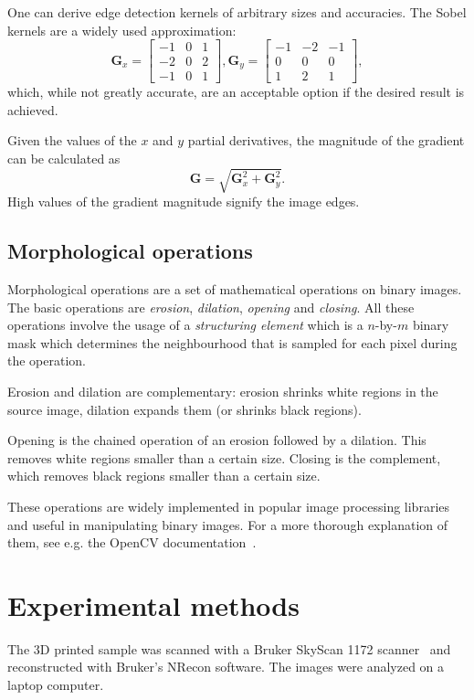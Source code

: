 \documentclass[a4paper,twoside,12pt]{article}
\begin{document}
One can derive edge detection kernels of arbitrary sizes and accuracies. The Sobel kernels are a widely used approximation:
\begin{equation}
    \mathbf{G}_x = \begin{bmatrix}
        -1 & 0 & 1 \\
        -2 & 0 & 2 \\
        -1 & 0 & 1
    \end{bmatrix},
    \mathbf{G}_y = \begin{bmatrix}
        -1 & -2 & -1 \\
        0 & 0 & 0 \\
        1 & 2 & 1
    \end{bmatrix},
\end{equation}
which, while not greatly accurate, are an acceptable option if the desired result is achieved.

Given the values of the $x$ and $y$ partial derivatives, the magnitude of the gradient can be calculated as
\[
    \mathbf{G} = \sqrt{\mathbf{G}_x^2 + \mathbf{G}_y^2}.
\]
High values of the gradient magnitude signify the image edges.

\subsection{Morphological operations}
Morphological operations are a set of mathematical operations on binary images. The basic operations are \emph{erosion}, \emph{dilation}, \emph{opening} and \emph{closing}. All these operations involve the usage of a \emph{structuring element} which is a $n$-by-$m$ binary mask which determines the neighbourhood that is sampled for each pixel during the operation.

Erosion and dilation are complementary: erosion shrinks white regions in the source image, dilation expands them (or shrinks black regions).

Opening is the chained operation of an erosion followed by a dilation. This removes white regions smaller than a certain size. Closing is the complement, which removes black regions smaller than a certain size.

These operations are widely implemented in popular image processing libraries and useful in manipulating binary images. For a more thorough explanation of them, see e.g. the OpenCV documentation~\cite{cv1, cv2}.

\section{Experimental methods}
The 3D printed sample was scanned with a Bruker SkyScan 1172 scanner~\cite{skyscan} and reconstructed with Bruker's NRecon software. The images were analyzed on a laptop computer.
\end{document}

